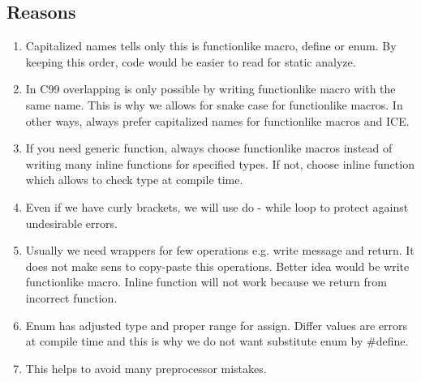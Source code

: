 \subsection{Reasons}
\begin{enumerate}
    \item Capitalized names tells only this is functionlike macro, define or enum. By keeping this order, code would be easier to read for static analyze.
    \item In C99 overlapping is only possible by writing functionlike macro with the same name. This is why we allows for snake case for functionlike macros. In other ways, always prefer capitalized names for functionlike macros and ICE.
    \item If you need generic function, always choose functionlike macros instead of writing many inline functions for specified types. If not, choose inline function which allows to check type at compile time.
    \item Even if we have curly brackets, we will use do - while loop to protect against undesirable errors.
    \item Usually we need wrappers for few operations e.g. write message and return. It does not make sens to copy-paste this operations. Better idea would be write functionlike macro. Inline function will not work because we return from incorrect function. 
    \item Enum has adjusted type and proper range for assign. Differ values are errors at compile time and this is why we do not want substitute enum by \#define.
    \item This helps to avoid many preprocessor mistakes.
\end{enumerate}